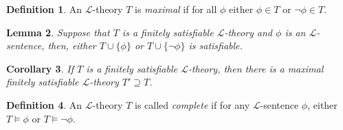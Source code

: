 \documentclass{amsart}
\newtheorem{theorem}{Theorem}[subsection]
\newtheorem{lemma}[theorem]{Lemma}
\newtheorem{corollary}[theorem]{Corollary}
\theoremstyle{definition}
\newtheorem{definition}[theorem]{Definition}
\numberwithin{equation}{section}
\begin{document}
\begin{definition}
	An $\mathcal{L}$-theory $T$ is \emph{maximal} if for all $\phi$ either $\phi \in T$ or $\neg \phi \in T$.
\end{definition}



\begin{lemma}
	Suppose that $T$ is a finitely satisfiable $\mathcal{L}$-theory and $\phi$ is an $\mathcal{L}$-sentence, then,
	either $T \cup \{\phi\}$ or $T \cup \{\neg\phi\}$ is satisfiable.
\end{lemma}

\begin{corollary}
	If $T$ is a finitely satisfiable $\mathcal{L}$-theory,
	then there is a maximal finitely satisfiable $\mathcal{L}$-theory $T' \supseteq T$.
\end{corollary}



\begin{definition}
	An $\mathcal{L}$-theory $T$ is called \emph{complete} if for any $\mathcal{L}$-sentence $\phi$,
	either $T \models \phi$ or $T \models \neg\phi$.
\end{definition}
\end{document}
